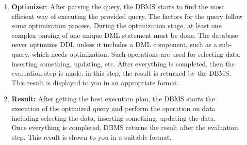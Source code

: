 \begin{enumerate}
    \item \textbf{Optimizer}: After parsing the query, the DBMS starts to find the most efficient way of executing the provided query. The factors for the query follow some optimization process. During the optimization stage, at least one complex parsing of one unique DML statement must be done. The database never optimizes DDL unless it includes a DML component, such as a sub-query, which needs optimization. Such operations are used for selecting data, inserting something, updating, etc. After everything is completed, then the evaluation step is made. in this step, the result is returned by the DBMS. This result is displayed to you in an appropriate format.
    \item \textbf{Result:} After getting the best execution plan, the DBMS starts the execution of the optimized query and perform the operation on data including selecting the data, inserting something, updating the data.\\
    Once everything is completed, DBMS returns the result after the evaluation step. This result is shown to you in a suitable format.\cite{Query,QueryProcessing,Oracle}
\end{enumerate}

